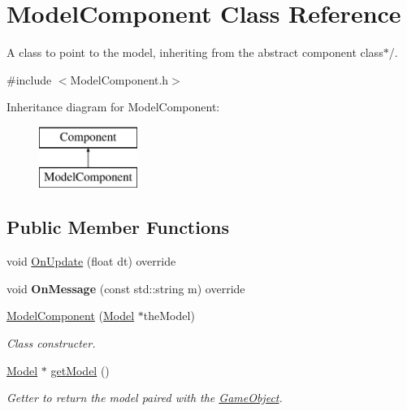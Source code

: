 \hypertarget{class_model_component}{}\section{Model\+Component Class Reference}
\label{class_model_component}


A class to point to the model, inheriting from the abstract component class$\ast$/.  




{\ttfamily \#include $<$Model\+Component.\+h$>$}

Inheritance diagram for Model\+Component\+:\begin{figure}[H]
\begin{center}
\leavevmode
\includegraphics[height=2.000000cm]{class_model_component}
\end{center}
\end{figure}
\subsection*{Public Member Functions}
\begin{DoxyCompactItemize}
\item 
void \mbox{\hyperlink{class_model_component_a5def59776319943854fb5da3dc515051}{On\+Update}} (float dt) override
\item 
\mbox{\label{class_model_component_a48d6170e857f323839039ce54e9418e1}} 
void {\bfseries On\+Message} (const std\+::string m) override
\item 
\mbox{\hyperlink{class_model_component_ad245e043248d6c6d8ac6856a860a9887}{Model\+Component}} (\mbox{\hyperlink{class_model}{Model}} $\ast$the\+Model)
\begin{DoxyCompactList}\small\item\em Class constructer. \end{DoxyCompactList}\item 
\mbox{\label{class_model_component_a0bcf3d110e4cda086ac931b60f472689}} 
\mbox{\hyperlink{class_model}{Model}} $\ast$ \mbox{\hyperlink{class_model_component_a0bcf3d110e4cda086ac931b60f472689}{get\+Model}} ()
\begin{DoxyCompactList}\small\item\em Getter to return the model paired with the \mbox{\hyperlink{class_game_object}{Game\+Object}}. \end{DoxyCompactList}\end{DoxyCompactItemize}
